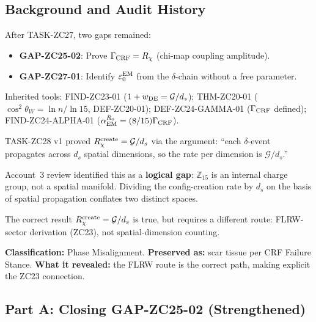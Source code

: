 \documentclass[12pt, a4paper]{article}
\begin{document}
\subsection{Background and Audit History}
\label{zc28:sec:background}

\begin{formalbox}[title={Inherited Context (unchanged from v1)}]
After TASK-ZC27, two gaps remained:
\begin{itemize}[leftmargin=*, noitemsep]
  \item \textbf{GAP-ZC25-02}: Prove $\Gamma_{\rm CRF} = R_\chi$
    (chi-map coupling amplitude).
  \item \textbf{GAP-ZC27-01}: Identify $\varepsilon_0^{\rm EM}$
    from the $\delta$-chain without a free parameter.
\end{itemize}
Inherited tools: FIND-ZC23-01 ($1+w_{\rm DE} = \mathcal{G}/d_s$);
THM-ZC20-01 ($\cos^2\theta_W = \ln n/\ln 15$, DEF-ZC20-01);
DEF-ZC24-GAMMA-01 ($\Gamma_{\rm CRF}$ defined);
FIND-ZC24-ALPHA-01 ($\alpha_{\rm EM}^{R_0} = (8/15)\Gamma_{\rm CRF}$).
\end{formalbox}

\begin{keybox}[title={PM-ZC28-01: v1 LEM-ZC28-01 Was Wrong-Route
  (Phase Misalignment)}]
\label{zc28:pm:lem01}
TASK-ZC28 v1 proved $R_\chi^{\rm create} = \mathcal{G}/d_s$ via the
argument: ``each $\delta$-event propagates across $d_s$ spatial
dimensions, so the rate per dimension is $\mathcal{G}/d_s$.''

Account~3 review identified this as a \textbf{logical gap}:
$\mathbb{Z}_{15}$ is an internal charge group, not a spatial
manifold. Dividing the config-creation rate by $d_s$ on the basis
of spatial propagation conflates two distinct spaces.

The correct result $R_\chi^{\rm create} = \mathcal{G}/d_s$ is true,
but requires a different route: FLRW-sector derivation (ZC23),
not spatial-dimension counting.

\medskip
\textbf{Classification:} Phase Misalignment.
\textbf{Preserved as:} scar tissue per CRF Failure Stance.
\textbf{What it revealed:} the FLRW route is the correct path,
making explicit the ZC23 connection.
\end{keybox}

\subsection{Part A: Closing GAP-ZC25-02 (Strengthened)}
\label{zc28:sec:gamma}
\end{document}
